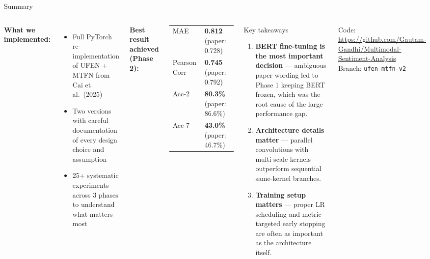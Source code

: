 \documentclass[aspectratio=169]{beamer}
\begin{document}
\begin{frame}{Summary}
  \begin{columns}[T]
      \textbf{What we implemented:}
      \begin{itemize}
        \item Full PyTorch re-implementation of UFEN + MTFN from
          Cai et al.\ (2025)\\
        \item Two versions with careful documentation of every design
          choice and assumption\\
        \item 25+ systematic experiments across 3 phases to understand
          what matters most
      \end{itemize}

      \vspace{8pt}
      \textbf{Best result achieved (Phase 2):}
      \medskip
      \begin{tabular}{ll}
        MAE             & \textbf{0.812} (paper: 0.728) \\
        Pearson Corr    & \textbf{0.745} (paper: 0.792) \\
        Acc-2           & \textbf{80.3\%} (paper: 86.6\%) \\
        Acc-7           & \textbf{43.0\%} (paper: 46.7\%) \\
      \end{tabular}

      \begin{block}{Key takeaways}
        \begin{enumerate}
          \item \textbf{BERT fine-tuning is the most important decision} —
            ambiguous paper wording led to Phase 1 keeping BERT frozen,
            which was the root cause of the large performance gap.
          \item \textbf{Architecture details matter} — parallel convolutions
            with multi-scale kernels outperform sequential same-kernel branches.
          \item \textbf{Training setup matters} — proper LR scheduling and
            metric-targeted early stopping are often as important as the
            architecture itself.
        \end{enumerate}
      \end{block}

      \vspace{4pt}
      \small
      Code: \url{https://github.com/Gautam-Gandhi/Multimodal-Sentiment-Analysis}\\
      Branch: \texttt{ufen-mtfn-v2}
  \end{columns}
\end{frame}
\end{document}
